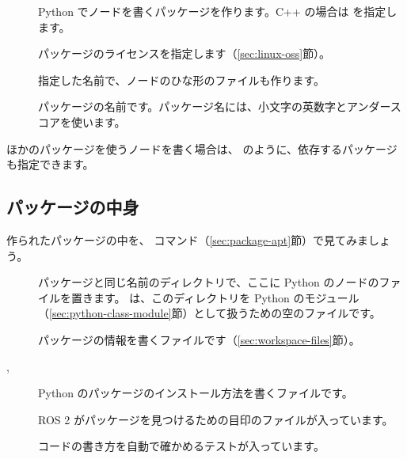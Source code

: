 \begin{description}
  \item[] Python でノードを書くパッケージを作ります。C++ の場合は  を指定します。
  \item[] パッケージのライセンスを指定します（\ref{sec:linux-oss}節）。
  \item[] 指定した名前で、ノードのひな形のファイルも作ります。
  \item[] パッケージの名前です。パッケージ名には、小文字の英数字とアンダースコアを使います。
\end{description}

ほかのパッケージを使うノードを書く場合は、 のように、依存するパッケージも指定できます。

\subsection{パッケージの中身}

作られたパッケージの中を、 コマンド（\ref{sec:package-apt}節）で見てみましょう。


\begin{description}
  \item[] パッケージと同じ名前のディレクトリで、ここに Python のノードのファイルを置きます。 は、このディレクトリを Python のモジュール（\ref{sec:python-class-module}節）として扱うための空のファイルです。
  \item[] パッケージの情報を書くファイルです（\ref{sec:workspace-files}節）。
  \item[, ] Python のパッケージのインストール方法を書くファイルです。
  \item[] ROS 2 がパッケージを見つけるための目印のファイルが入っています。
  \item[] コードの書き方を自動で確かめるテストが入っています。
\end{description}

